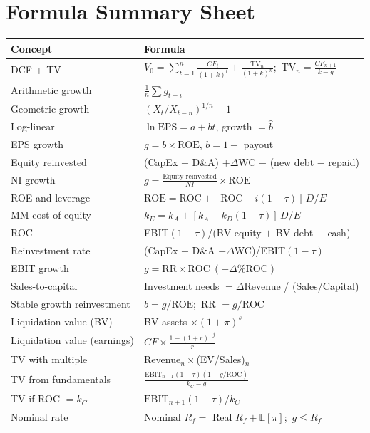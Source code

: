 \section{Formula Summary Sheet}
\begin{center}
\small
\renewcommand{\arraystretch}{1.45}
\begin{longtable}{@{}p{4.8cm}p{10.2cm}@{}}
\toprule
\textbf{Concept} & \textbf{Formula}\\
\midrule
\endhead
DCF + TV & $V_0=\sum_{t=1}^n\frac{CF_t}{(1+k)^t}+\frac{\text{TV}_n}{(1+k)^n}$;\ $\text{TV}_n=\frac{CF_{n+1}}{k-g}$\\
Arithmetic growth & $\frac1n\sum g_{t-i}$\\
Geometric growth & $(X_t/X_{t-n})^{1/n}-1$\\
Log-linear & $\ln\text{EPS}=a+bt$, growth $=\hat b$\\
EPS growth & $g=b\times\text{ROE}$, $b=1-$ payout\\
Equity reinvested & (CapEx $-$ D\&A) $+\Delta$WC $-$ (new debt $-$ repaid)\\
NI growth & $g=\frac{\text{Equity reinvested}}{NI}\times\text{ROE}$\\
ROE and leverage & $\text{ROE}=\text{ROC}+[\text{ROC}-i(1-\tau)]\,D/E$\\
MM cost of equity & $k_E=k_A+[k_A-k_D(1-\tau)]\,D/E$\\
ROC & EBIT$(1-\tau)$/(BV equity $+$ BV debt $-$ cash)\\
Reinvestment rate & (CapEx $-$ D\&A $+\Delta$WC)/EBIT$(1-\tau)$\\
EBIT growth & $g=\text{RR}\times\text{ROC}\ (+\Delta\%\text{ROC})$\\
Sales-to-capital & Investment needs $=\Delta$Revenue / (Sales/Capital)\\
Stable growth reinvestment & $b=g/\text{ROE}$;\ RR $=g/\text{ROC}$\\
Liquidation value (BV) & BV assets $\times(1+\pi)^s$\\
Liquidation value (earnings) & $CF\times\frac{1-(1+r)^{-j}}{r}$\\
TV with multiple & Revenue$_n\times$(EV/Sales)$_n$\\
TV from fundamentals & $\frac{\text{EBIT}_{n+1}(1-\tau)(1-g/\text{ROC})}{k_C-g}$\\
TV if ROC $=k_C$ & $\text{EBIT}_{n+1}(1-\tau)/k_C$\\
Nominal rate & Nominal $R_f=$ Real $R_f+\mathbb{E}[\pi]$;\ $g\leq R_f$\\
\bottomrule
\end{longtable}
\end{center}

